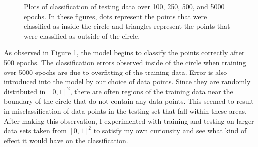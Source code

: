 \documentclass[8pt]{article}
\theoremstyle{definition}
\begin{document}
\begin{figure}[H]
    \centering
    \begin{subfigure}[t]{0.49\textwidth}
    \end{subfigure}
    \hfill
    \begin{subfigure}[t]{0.49\textwidth}
    \end{subfigure}
    \begin{subfigure}[t]{0.49\textwidth}
    \end{subfigure}
    \hfill
    \begin{subfigure}[t]{0.49\textwidth}
    \end{subfigure}
    \caption{Plots of classification of testing data over 100, 250, 500, and 5000 epochs. In these figures, dots represent the points that were classified as inside the circle and triangles represent the points that were classified as outside of the circle.}
\end{figure}

As observed in Figure 1, the model begins to classify the points correctly after 500 epochs. The classification errors observed inside of the circle when training over 5000 epochs are due to overfitting of the training data. Error is also introduced into the model by our choice of data points. Since they are randomly distributed in $[0,1]^2$, there are often regions of the training data near the boundary of the circle that do not contain any data points. This seemed to result in misclassification of data points in the testing set that fall within these areas. After making this observation, I experimented with training and testing on larger data sets taken from $[0,1]^2$ to satisfy my own curiousity and see what kind of effect it would have on the classification.
\end{document}
